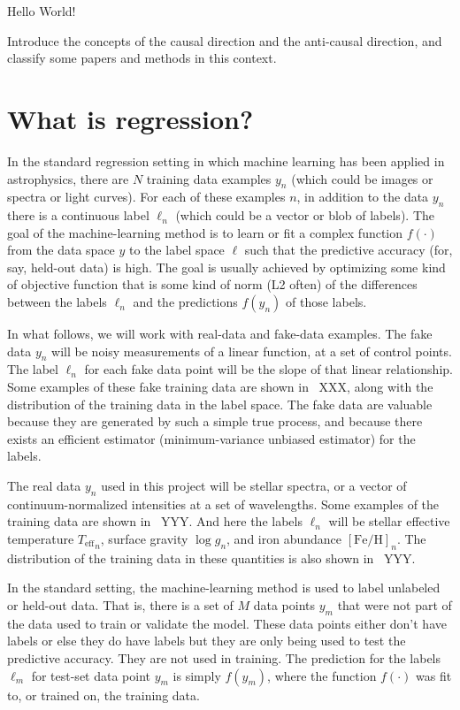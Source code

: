 \documentclass[12pt, letterpaper]{article}
\newcommand{\teff}{{T_{\mathrm{eff}}}}
\newcommand{\logg}{\log g}
\newcommand{\feh}{\left[\mathrm{Fe/H}\right]}
\begin{document}
Hello World!

Introduce the concepts of the causal direction and the anti-causal
direction, and classify some papers and methods in this context.

\section{What is regression?}


In the standard regression setting in which machine learning has been
applied in astrophysics, there are $N$ training data examples $y_n$
(which could be images or spectra or light curves).
For each of these examples $n$, in addition to the data $y_n$ there is
a continuous label $\ell_n$ (which could be a vector or blob of
labels).
The goal of the machine-learning method is to learn or fit a complex
function $f(\cdot)$ from the data space $y$ to the label space $\ell$
such that the predictive accuracy (for, say, held-out data) is high.
The goal is usually achieved by optimizing some kind of objective
function that is some kind of norm (L2 often) of the differences
between the labels $\ell_n$ and the predictions $f(y_n)$ of those
labels.

In what follows, we will work with real-data and fake-data examples.
The fake data $y_n$ will be noisy measurements of a linear function,
at a set of control points.
The label $\ell_n$ for each fake data point will be the slope of that
linear relationship.
Some examples of these fake training data are shown in
\figurename~XXX, along with the distribution of the training data in
the label space.
The fake data are valuable because they are generated by such a simple
true process, and because there exists an efficient estimator
(minimum-variance unbiased estimator) for the labels.

The real data $y_n$ used in this project will be stellar spectra, or
a vector of continuum-normalized intensities at a set of wavelengths.
Some examples of the training data are shown in \figurename~YYY.
And here the labels $\ell_n$ will be stellar effective temperature
$\teff_n$, surface gravity $\logg_n$, and iron abundance $\feh_n$.
The distribution of the training data in these quantities is also
shown in \figurename~YYY.

In the standard setting, the machine-learning method is used to label
unlabeled or held-out data.
That is, there is a set of $M$ data points $y_m$ that were not part of
the data used to train or validate the model.
These data points either don't have labels or else they do have labels
but they are only being used to test the predictive accuracy.
They are not used in training.
The prediction for the labels $\ell_m$ for test-set data point $y_m$
is simply $f(y_m)$, where the function $f(\cdot)$ was fit to, or
trained on, the training data.
\end{document}
